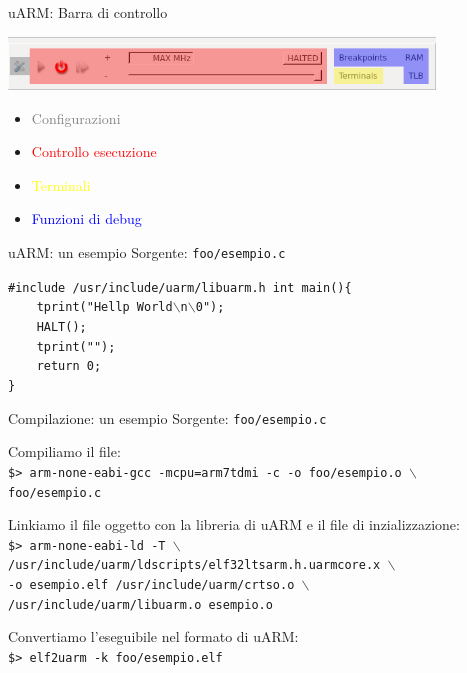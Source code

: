 \documentclass{beamer}
\begin{document}
\begin{frame}{uARM: Barra di controllo}

\begin{center}
\includegraphics[width=0.85\textwidth]{img/controllo_colori.png}
\end{center}

\vfill

{\footnotesize
\begin{itemize}\itemsep1pt
\item \textcolor{gray}{Configurazioni}
\item \textcolor{red}{Controllo esecuzione}
\item \textcolor{yellow}{Terminali}
\item \textcolor{blue}{Funzioni di debug}
\end{itemize}}
\end{frame}

\begin{frame}{uARM: un esempio}
Sorgente: \texttt{foo/esempio.c}

\vspace{20px}
\begin{framed}
\small\texttt{\#include /usr/include/uarm/libuarm.h\newline
\newline
int main()\{\\
~~~~tprint("Hellp World$\backslash$n$\backslash$0");\\
~~~~HALT();\\
~~~~tprint("");\\
~~~~return 0;\\
\} }
\end{framed}
\end{frame}

\begin{frame}{Compilazione: un esempio}
Sorgente: \texttt{foo/esempio.c}

\vspace{15px}
Compiliamo il file:\\
{\small\texttt{\$> arm-none-eabi-gcc -mcpu=arm7tdmi -c -o foo/esempio.o $\backslash$
\\foo/esempio.c}}

\vspace{15px}
Linkiamo il file oggetto con la libreria di uARM e il file di inzializzazione:\\
{\small\texttt{\$> arm-none-eabi-ld -T $\backslash$\\
/usr/include/uarm/ldscripts/elf32ltsarm.h.uarmcore.x $\backslash$\\
-o esempio.elf /usr/include/uarm/crtso.o $\backslash$\\
/usr/include/uarm/libuarm.o esempio.o}}

\vspace{15px}
Convertiamo l'eseguibile nel formato di uARM:\\
{\small\texttt{\$> elf2uarm -k foo/esempio.elf}}

\end{frame}
\end{document}
